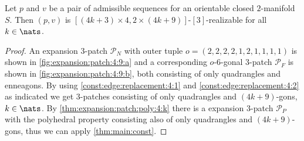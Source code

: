 \begin{theorem}
  Let $p$ and $v$ be a pair of admissible sequences for an orientable closed $2$-manifold $S$. Then $(p, v)$ is $[(4k + 3) \times 4, 2 \times (4k+9)]$-$[3]$-realizable for all $k \in \nats$.
  \begin{proof}
    An expansion $3$-patch $\mathcal{P}_N$ with outer tuple $o = (2, 2, 2, 2, 1, 2, 1, 1, 1, 1)$ is shown in \autoref{fig:expansion:patch:4:9:a} and a corresponding $o$-$6$-gonal $3$-patch $\mathcal{P}_F$ is shown in \autoref{fig:expansion:patch:4:9:b}, both consisting of only quadrangles and enneagons. By using \autoref{const:edge:replacement:4:1} and \autoref{const:edge:replacement:4:2} as indicated we get $3$-patches consisting of only quadrangles and $(4k+9)$-gons, $k \in \nats$. By \autoref{thm:expansion:patch:poly:4:k} there is a expansion $3$-patch $\mathcal{P}_P$ with the polyhedral property consisting also of only quadrangles and $(4k+9)$-gons, thus we can apply \autoref{thm:main:const}.
  \end{proof}
\end{theorem}
{\par\vspace*{\fill}}
